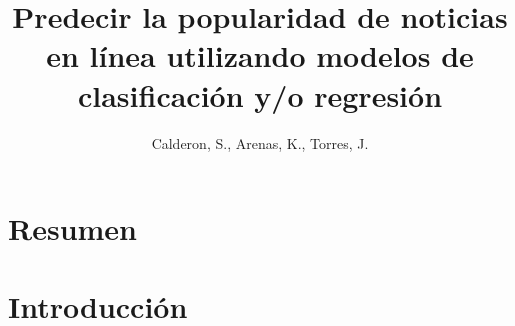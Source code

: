 \documentclass[
  number,
  preprint,
  3p,
  twocolumn]{elsarticle}
\begin{document}
\begin{frontmatter}
\title{Predecir la popularidad de noticias en línea utilizando modelos
de clasificación y/o regresión}
\author[]{Calderon, S., Arenas, K., Torres, J.%
%
}




        





\end{frontmatter}
    
\section{Resumen}\label{resumen}

\section{Introducción}\label{introducciuxf3n}
\end{document}
